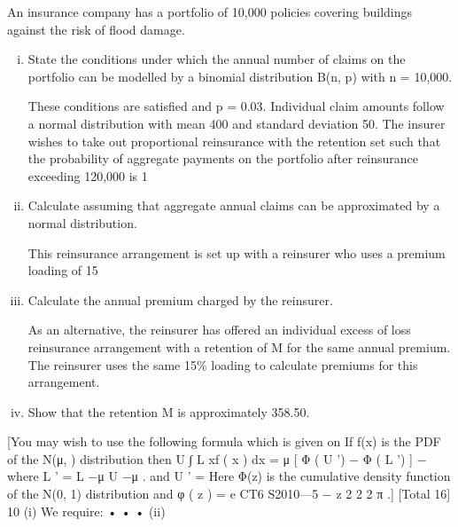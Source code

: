 \documentclass[a4paper,12pt]{article}
\begin{document}
 
\item 
An insurance company has a portfolio of 10,000 policies covering buildings against the risk of flood damage.
\begin{enumerate}[(i)]
\item State the conditions under which the annual number of claims on the portfolio can be modelled by a binomial distribution B(n, p) with n = 10,000.

These conditions are satisfied and p = 0.03. Individual claim amounts follow a normal distribution with mean 400 and standard deviation 50. The insurer wishes to take out proportional reinsurance with the retention \alpha set such that the probability of
aggregate payments on the portfolio after reinsurance exceeding 120,000 is 1%
\item %
Calculate \alpha assuming that aggregate annual claims can be approximated by a
normal distribution.

This reinsurance arrangement is set up with a reinsurer who uses a premium loading
of 15%
\item %
Calculate the annual premium charged by the reinsurer.

As an alternative, the reinsurer has offered an individual excess of loss reinsurance
arrangement with a retention of M for the same annual premium. The reinsurer uses
the same 15\% loading to calculate premiums for this arrangement.
\item %
Show that the retention M is approximately 358.50.
\end{enumerate}
[You may wish to use the following formula which is given on %
If f(x) is the PDF of the N(μ,  ) distribution then
U
∫ L
xf ( x ) dx = μ [ Φ ( U ') − Φ ( L ') ] − \sigma [ φ ( U ') − φ ( L ') ]
where L ' =
L −μ
U −μ
.
and U ' =
\sigma
\sigma
Here Φ(z) is the cumulative density function of the N(0, 1) distribution and
φ ( z ) =
e
CT6 S2010—5
−
z 2
2
2 π
.]
[Total 16]
\new%
10
(i)
We require:
•
•
•
(ii)
\end{document}

